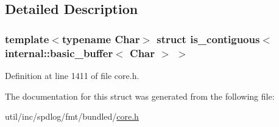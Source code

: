 \subsection{Detailed Description}
\subsubsection*{template$<$typename Char$>$\newline
struct is\+\_\+contiguous$<$ internal\+::basic\+\_\+buffer$<$ Char $>$ $>$}



Definition at line 1411 of file core.\+h.



The documentation for this struct was generated from the following file\+:\begin{DoxyCompactItemize}
\item 
util/inc/spdlog/fmt/bundled/\hyperlink{core_8h}{core.\+h}\end{DoxyCompactItemize}
